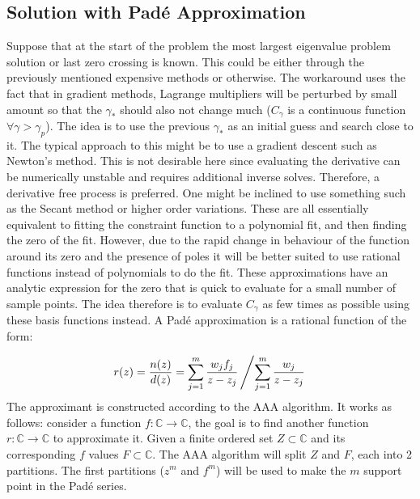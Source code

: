 \documentclass[twocolumn]{revtex4-2}
\begin{document}
\subsection{Solution with Padé Approximation}
\label{sec:pade}
Suppose that at the start of the problem the most largest eigenvalue problem solution or last zero crossing is known. This could be either through the previously mentioned expensive methods or otherwise. The workaround uses the fact that in gradient methods, Lagrange multipliers will be perturbed by small amount so that the $\gamma_*$ should also not change much ($C_\gamma$ is a continuous function $\forall \gamma>\gamma_p$). The idea is to use the previous $\gamma_*$ as an initial guess and search close to it. The typical approach to this might be to use a gradient descent such as Newton's method. This is not desirable here since evaluating the derivative can be numerically unstable and requires additional inverse solves. Therefore, a derivative free process is preferred. One might be inclined to use something such as the Secant method or higher order variations. These are all essentially equivalent to fitting the constraint function to a polynomial fit, and then finding the zero of the fit. However, due to the rapid change in behaviour of the function around its zero and the presence of poles it will be better suited to use rational functions instead of polynomials to do the fit\cite{nakatsukasa2018aaa}. These approximations have an analytic expression for the zero that is quick to evaluate for a small number of sample points. The idea therefore is to evaluate $C_\gamma$ as few times as possible using these basis functions instead. A Padé approximation is a rational function of the form:

\begin{align}
    r(z) = \frac{n(z)}{d(z)}=\sum_{j=1}^m\frac{w_jf_j}{z-z_j}\left/ \sum_{j=1}^m\frac{w_j}{z-z_j}\right.
\end{align}
The approximant is constructed according to the AAA algorithm. It works as follows: consider a function $f:\mathbb{C}\rightarrow\mathbb{C}$, the goal is to find another function $r:\mathbb{C}\rightarrow\mathbb{C}$ to approximate it. Given a finite ordered set $Z\subset\mathbb{C}$ and its corresponding $f$ values $F\subset\mathbb{C}$. The AAA algorithm will split $Z$ and $F$, each into 2 partitions. The first partitions ($z^m$ and $f^m$) will be used to make the $m$ support point in the Padé series.
\end{document}
